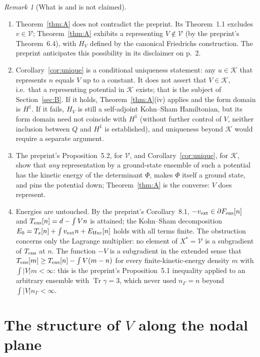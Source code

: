 \documentclass[11pt,a4paper]{article}
\theoremstyle{plain}
\theoremstyle{definition}
\theoremstyle{remark}
\newtheorem{remark}[theorem]{Remark}
\newcommand{\VV}{\mathcal{V}}
\newcommand{\KK}{\mathcal{K}}
\DeclareMathOperator{\Tr}{Tr}
\begin{document}
\begin{remark}[What is and is not claimed]\label{rem:scope}
\begin{enumerate}
\item Theorem~\ref{thm:A} does not contradict the preprint. Its Theorem~1.1 excludes $v\in\VV$; Theorem~\ref{thm:A} exhibits a representing $V\notin\VV$ (by the preprint's Theorem~6.4), with $H_V$ defined by the canonical Friedrichs construction. The preprint anticipates this possibility in its disclaimer on p.~2.
\item Corollary~\ref{cor:unique} is a conditional uniqueness statement: any $u\in\KK$ that represents $n$ equals $V$ up to a constant. It does not assert that $V\in\KK$, i.e.\ that a representing potential in $\KK$ exists; that is the subject of Section~\ref{sec:B}. If it holds, Theorem~\ref{thm:A}(iv) applies and the form domain is $H^1$. If it fails, $H_V$ is still a self-adjoint Kohn--Sham Hamiltonian, but its form domain need not coincide with $H^1$ (without further control of $V$, neither inclusion between $Q$ and $H^1$ is established), and uniqueness beyond $\KK$ would require a separate argument.
\item The preprint's Proposition~5.2, for $\VV$, and Corollary~\ref{cor:unique}, for $\KK$, show that \emph{any} representation by a ground-state ensemble of such a potential has the kinetic energy of the determinant $\Phi$, makes $\Phi$ itself a ground state, and pins the potential down; Theorem~\ref{thm:A} is the converse: $V$ does represent.
\item Energies are untouched. By the preprint's Corollary~8.1, $-v_{\rm ext}\in\partial F_{\rm ens}[n]$ and $T_{\rm ens}[n]=d-\int Vn$ is attained; the Kohn--Sham decomposition $E_0=T_s[n]+\int v_{\rm ext}n+E_{\rm Hxc}[n]$ holds with all terms finite. The obstruction concerns only the Lagrange multiplier: no element of $X^*=\VV$ is a subgradient of $T_{\rm ens}$ at $n$. The function $-V$ is a subgradient in the extended sense that $T_{\rm ens}[m]\ge T_{\rm ens}[n]-\int V(m-n)$ for every finite-kinetic-energy density $m$ with $\int|V|m<\infty$: this is the preprint's Proposition~5.1 inequality applied to an arbitrary ensemble with $\Tr\gamma=3$, which never used $n_\Gamma=n$ beyond $\int|V|n_\Gamma<\infty$.
\end{enumerate}
\end{remark}

\section{The structure of \texorpdfstring{$V$}{V} along the nodal plane}\label{sec:strip}
\end{document}
